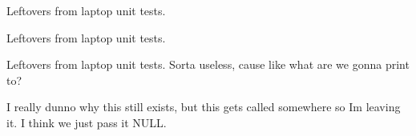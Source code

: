 
\begin{DoxyRefList}
\item[Global \mbox{\hyperlink{rb__tree_8c_aa02803c2713094e61fa50807fa7a5116}{rb\+Check\+Black\+Height}} (rbtree $\ast$rbt)]\label{deprecated__deprecated000003}%
%
Leftovers from laptop unit tests. 
\item[Global \mbox{\hyperlink{rb__tree_8c_a0eb9842e366817eb18eac0e319fb04db}{rb\+Check\+Order}} (rbtree $\ast$rbt, void $\ast$min, void $\ast$max)]\label{deprecated__deprecated000002}%
%
Leftovers from laptop unit tests. 
\item[Global \mbox{\hyperlink{rb__tree_8c_a447d21f412285d3455356d2975a6ced3}{rb\+Print}} (rbtree $\ast$rbt, void($\ast$print\+\_\+func)(void $\ast$))]\label{deprecated__deprecated000001}%
%
Leftovers from laptop unit tests. Sorta useless, cause like what are we gonna print to?  
\item[Global \mbox{\hyperlink{uvfr__utils_8c_ab80c00a024c34da7f7926212ce10ef01}{setup\+\_\+extern\+\_\+devices}} (void $\ast$argument)]\label{deprecated__deprecated000004}%
%
I really dunno why this still exists, but this gets called somewhere so Im leaving it. I think we just pass it N\+U\+LL.
\end{DoxyRefList}